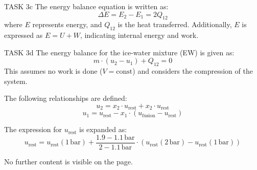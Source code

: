 TASK 3c  
The energy balance equation is written as:  
\[
\Delta E = E_2 - E_1 = 2 Q_{12}
\]  
where \( E \) represents energy, and \( Q_{12} \) is the heat transferred.  
Additionally, \( E \) is expressed as \( E = U + W \), indicating internal energy and work.  

TASK 3d  
The energy balance for the ice-water mixture (EW) is given as:  
\[
m \cdot (u_2 - u_1) + Q_{12} = 0
\]  
This assumes no work is done (\( V = \text{const} \)) and considers the compression of the system.  

The following relationships are defined:  
\[
u_2 = x_2 \cdot u_{\text{rest}} + x_2 \cdot u_{\text{rest}}
\]  
\[
u_1 = u_{\text{rest}} - x_1 \cdot (u_{\text{fusion}} - u_{\text{rest}})
\]  

The expression for \( u_{\text{rest}} \) is expanded as:  
\[
u_{\text{rest}} = u_{\text{rest}}(1 \, \text{bar}) + \frac{1.9 - 1.1 \, \text{bar}}{2 - 1.1 \, \text{bar}} \cdot (u_{\text{rest}}(2 \, \text{bar}) - u_{\text{rest}}(1 \, \text{bar}))
\]  

No further content is visible on the page.